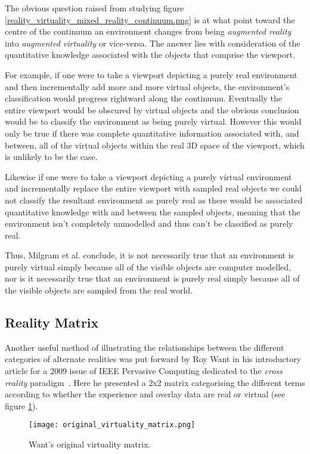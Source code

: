 The obvious question raised from studying figure \ref{reality_virtuality_mixed_reality_continuum.png} is at what point toward the centre of the continuum an environment changes from being \textit{augmented reality} into \textit{augmented virtuality} or vice-versa. The answer lies with consideration of the quantitative knowledge associated with the objects that comprise the viewport.

For example, if one were to take a viewport depicting a purely real environment and then incrementally add more and more virtual objects, the environment's classification would progress rightward along the continuum. Eventually the entire viewport would be obscured by virtual objects and the obvious conclusion would be to classify the environment as being purely virtual. However this would only be true if there was complete quantitative information associated with, and between, all of the virtual objects within the real 3D space of the viewport, which is unlikely to be the case.

Likewise if one were to take a viewport depicting a purely virtual environment and incrementally replace the entire viewport with sampled real objects we could not classify the resultant environment as purely real as there would be associated quantitative knowledge with and between the sampled objects, meaning that the environment isn't completely unmodelled and thus can't be classified as purely real.


Thus, Milgram et al. conclude, it is not necessarily true that an environment is purely virtual simply because all of the visible objects are computer modelled, nor is it necessarily true that an environment is purely real simply because all of the visible objects are sampled from the real world.

\subsection{Reality Matrix}
\label{subsec:reality_matrix}
Another useful method of illustrating the relationships between the different categories of alternate realities was put forward by Roy Want in his introductory article for a 2009 issue of IEEE Pervasive Computing dedicated to the \textit{cross reality} paradigm~\cite{Want2009}. Here he presented a 2x2 matrix categorising the different terms according to whether the experience and overlay data are real or virtual (see figure \ref{original_virtuality_matrix.png}).

\begin{figure}[h]
\centering
\texttt{[image: original\_virtuality\_matrix.png]}
\caption{Want's original virtuality matrix.}
\label{original_virtuality_matrix.png}
\end{figure}

